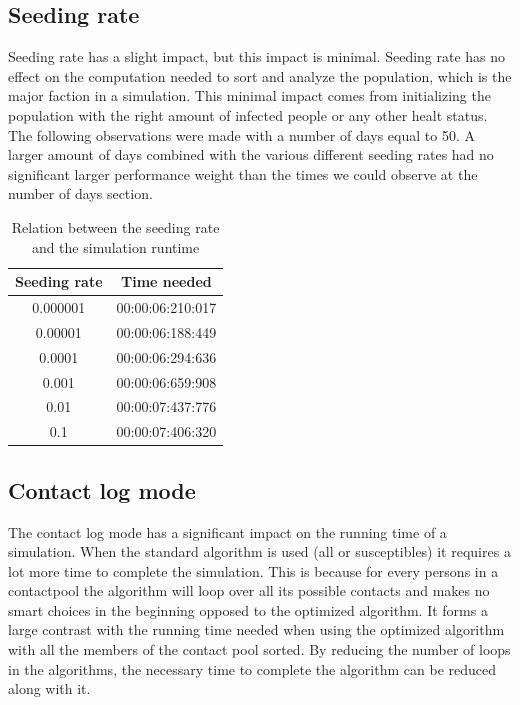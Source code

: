 \documentclass[runningheads]{llncs}
\begin{document}
\newpage
\subsection{Seeding rate}
Seeding rate has a slight impact, but this impact is minimal. Seeding rate has no effect on the computation needed to sort and analyze the population, which is the major faction in a simulation. This minimal impact comes from initializing the population with the right amount of infected people or any other healt status. The following observations were made with a number of days equal to 50. A larger amount of days combined with the various different seeding rates had no significant larger performance weight than the times we could observe at the number of days section.

\begin{table}
	\caption{Relation between the seeding rate and the simulation runtime}
	\begin{center}
		\begin{tabular}{ | c | c |}
			\hline
			Seeding rate & Time needed \\ \hline
			0.000001 & 00:00:06:210:017 \\ \hline
			0.00001 & 00:00:06:188:449 \\ \hline
			0.0001 & 00:00:06:294:636 \\ \hline
			0.001 & 00:00:06:659:908 \\ \hline
			0.01 & 00:00:07:437:776 \\ \hline
			0.1 & 00:00:07:406:320 \\
			\hline	
		\end{tabular}
	\end{center} 
\end{table} 

\subsection{Contact log mode}
The contact log mode has a significant impact on the running time of a simulation. When the standard algorithm is used (all or susceptibles) it requires a lot more time to complete the simulation. This is because for every persons in a contactpool the algorithm will loop over all its possible contacts and makes no smart choices in the beginning opposed to the optimized algorithm. It forms a large contrast with the running time needed when using the optimized algorithm with all the members of the contact pool sorted. By reducing the number of loops in the algorithms, the necessary time to complete the algorithm can be reduced along with it.
\end{document}
